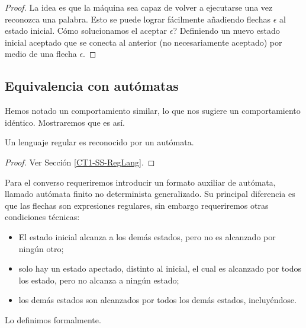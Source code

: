 \begin{proof}
    La idea es que la m\'aquina sea capaz de volver a ejecutarse una vez reconozca una palabra.
    Esto se puede lograr f\'acilmente a\~nadiendo flechas \(\epsilon\) al estado inicial.
    \preg C\'omo solucionamos el aceptar \(\epsilon\)?
    Definiendo un nuevo estado inicial aceptado que se conecta al anterior (no necesariamente aceptado) por medio de una flecha \(\epsilon.\) 
\end{proof}

\subsection{Equivalencia con aut\'omatas}

Hemos notado un comportamiento similar, lo que nos sugiere un comportamiento id\'entico.
Mostraremos que es as\'i.

\begin{lema}
    Un lenguaje regular es reconocido por un aut\'omata.
\end{lema}

\begin{proof}
    Ver Secci\'on \ref{CT1-SS-RegLang}.
\end{proof}

Para el converso requeriremos introducir un formato auxiliar de aut\'omata, llamado aut\'omata finito no determinista generalizado. Su principal diferencia es que las flechas son expresiones regulares, sin embargo requeriremos otras condiciones t\'ecnicas:
\begin{itemize}
    \item El estado inicial alcanza a los dem\'as estados, pero no es alcanzado por ning\'un otro;
    \item solo hay un estado apectado, distinto al inicial, el cual es alcanzado por todos los estado, pero no alcanza a ning\'un estado;
    \item los dem\'as estados son alcanzados por todos los dem\'as estados, incluy\'endose.
\end{itemize}

Lo definimos formalmente.

